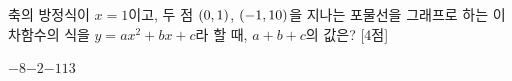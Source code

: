 축의 방정식이 $x=1$이고, 두 점 $(0{,}\mkern3mu 1)$, $(-1{,}\mkern3mu 10)$을 지나는 포물선을 그래프로 하는 이차함수의 식을 $y=ax^2+bx+c$라 할 때, $a+b+c$의 값은?  \mbox{[4점]}
\begin{choices32}{$-8$}{$-2$}{$-1$}{$1$}{$3$}\end{choices32}
